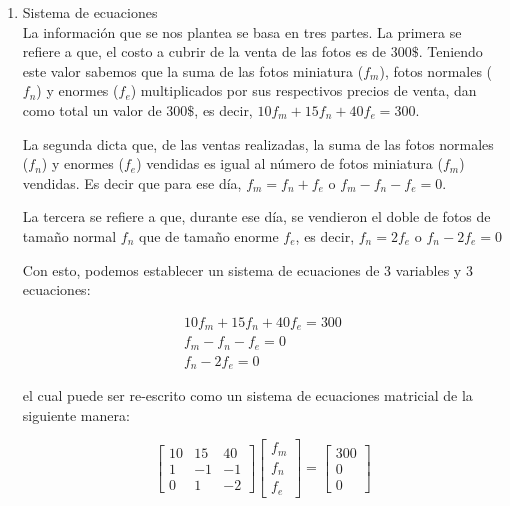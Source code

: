 \documentclass[english,notitlepage,letterpaper, 10pt]{article} %
\begin{document}
\begin{enumerate}
        \begin{enumerate}
          \item Sistema de ecuaciones \\
            La información que se nos plantea se basa en tres partes. La primera se refiere a que, el costo a cubrir de la venta de las fotos es de $300\$$. Teniendo este valor sabemos que la suma de las fotos miniatura ($f_m$), fotos normales ($f_n$) y enormes ($f_e$) multiplicados por sus respectivos precios de venta, dan como total un valor de $300\$$, es decir, $10f_m + 15f_n + 40f_e = 300$.
            
            La segunda dicta que, de las ventas realizadas, la suma de las fotos normales ($f_n$) y enormes ($f_e$) vendidas es igual al número de fotos miniatura ($f_m$) vendidas. Es decir que para ese día, $f_m = f_n + f_e$ o $f_m - f_n - f_e = 0$. 

            La tercera se refiere a que, durante ese día, se vendieron el doble de fotos de tamaño normal $f_n$ que de tamaño enorme $f_e$, es decir, $ f_n = 2f_e$ o $ f_n - 2f_e = 0$ 

            Con esto, podemos establecer un sistema de ecuaciones de 3 variables y 3 ecuaciones:

            \begin{displaymath}
              \begin{matrix}
                10f_m + 15f_n + 40f_e = 300 \\
                f_m - f_n - f_e = 0 \\
                f_n - 2f_e = 0
              \end{matrix}
            \end{displaymath}

            el cual puede ser re-escrito como un sistema de ecuaciones matricial de la siguiente manera:

            \begin{displaymath}
              \begin{bmatrix}
                10 & 15 & 40 \\
                1 & -1 & -1 \\
                0 & 1 & -2 
              \end{bmatrix}
              \begin{bmatrix}
                f_m \\
                f_n \\
                f_e
              \end{bmatrix}
              =
              \begin{bmatrix}
                300 \\
                0 \\
                0
              \end{bmatrix}
            \end{displaymath}


\end{enumerate}
\end{enumerate}
\end{document}
